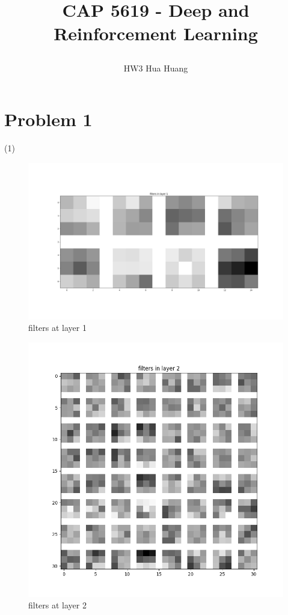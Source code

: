 \documentclass[12pt]{article}
\begin{document}
\title*{\centerline{\huge{CAP 5619 \-- Deep and Reinforcement Learning}}}
\author*{\centerline{HW3 Hua Huang}}%

\section {Problem 1}
(1) 
\begin{figure}[h]
    \centering
    \includegraphics [scale=0.3]{filters_layer1.png}
    \caption {filters at layer 1}
\end{figure}

\begin{figure}[h]
    \centering
    \includegraphics [scale=0.5]{filters_layer2.png}
    \caption {filters at layer 2}
\end{figure}
\end{document}
